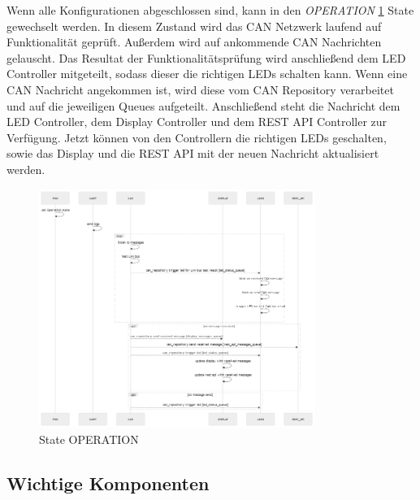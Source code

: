 Wenn alle Konfigurationen abgeschlossen sind, kann in den \textit{OPERATION} \ref{fig:state_operation} State gewechselt werden. In diesem Zustand wird das CAN Netzwerk laufend auf Funktionalität geprüft. Außerdem wird auf ankommende CAN Nachrichten gelauscht. Das Resultat der Funktionalitätsprüfung wird anschließend dem LED Controller mitgeteilt, sodass dieser die richtigen LEDs schalten kann. Wenn eine CAN Nachricht angekommen ist, wird diese vom CAN Repository verarbeitet und auf die jeweiligen Queues aufgeteilt. Anschließend steht die Nachricht dem LED Controller, dem Display Controller und dem REST API Controller zur Verfügung. Jetzt können von den Controllern die richtigen LEDs geschalten, sowie das Display und die REST API mit der neuen Nachricht aktualisiert werden.
\begin{figure}
  \centering
  \includegraphics[width=0.8\textwidth]{img/state_operation.PNG}
  \caption{State OPERATION}
  \label{fig:state_operation}
\end{figure}

\subsection{Wichtige Komponenten}
